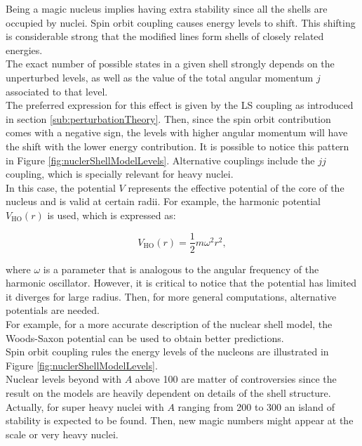 \documentclass[openany]{book}
\begin{document}
Being a magic nucleus implies having extra stability since all the shells are occupied by nuclei.  Spin orbit coupling causes energy levels to shift. This shifting is considerable strong that the modified lines form shells of closely related energies.  \\

The exact number of possible states in a given shell strongly depends on the unperturbed levels, as well as the value of the total angular momentum $j$ associated to that level.  \\

The preferred expression for this effect is given by the LS coupling as introduced in section \ref{sub:perturbationTheory}. Then, since the spin orbit contribution comes with a negative sign, the levels with higher angular momentum will have the shift with the lower energy contribution. It is possible to notice this pattern in Figure \ref{fig:nuclerShellModelLevels}. Alternative couplings include the $jj$ coupling, which is specially relevant for heavy nuclei. \\

In this case, the potential $V$ represents the effective potential of the core of the nucleus and is valid at certain radii. For example, the harmonic potential $V_{\mathrm{HO}}(r)$ is used, which is expressed as: 


\begin{equation} \label{eq:nuclearShell_harmonicOscillator}
	V_{\mathrm{HO}}(r) = \frac{1}{2}m\omega^2r^2,
\end{equation}

where $\omega$ is a parameter that is analogous to the angular frequency of the harmonic oscillator. However, it is critical to notice that the potential has limited it diverges for large radius. Then, for more general computations, alternative potentials are needed.  \\

For example, for a more accurate description of the nuclear shell model, the Woods-Saxon potential can be used to obtain better predictions. \\

Spin orbit coupling rules the energy levels of the nucleons are illustrated in Figure \ref{fig:nuclerShellModelLevels}.  \\

Nuclear levels beyond with $A$ above 100 are matter of controversies since the result on the models are heavily dependent on details of the shell structure. Actually, for super heavy nuclei with $A$ ranging from 200 to 300 an island of stability is expected to be found. Then, new magic numbers might appear at the scale or very heavy nuclei.  \\
\end{document}
